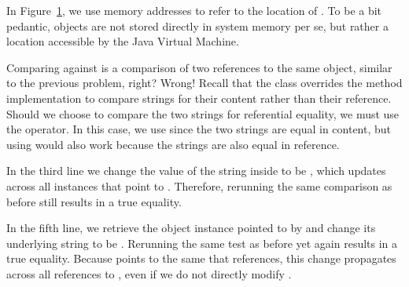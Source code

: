 \begin{figure}[htp!]
\centering
{}
\label{fig:memoryref}
\end{figure}

In Figure~\ref{fig:memoryref}, we use memory addresses to refer to the location of . To be a bit pedantic, objects are not stored directly in system memory per se, but rather a location accessible by the Java Virtual Machine.

Comparing  against  is a comparison of two references to the same object, similar to the previous problem, right? Wrong! Recall that the  class overrides the  method implementation to compare strings for their content rather than their reference. Should we choose to compare the two strings for referential equality, we must use the \ttt{==} operator. In this case, we use  since the two strings are equal in content, but using \ttt{==} would also work because the strings are also equal in reference.

In the third line we change the value of the string inside  to be , which updates across all instances that point to . Therefore, rerunning the same comparison as before still results in a true equality.

In the fifth line, we retrieve the  object instance pointed to by  and change its underlying string to be . Rerunning the same test as before yet again results in a true equality. Because  points to the same  that  references, this change propagates across all references to , even if we do not directly modify .

